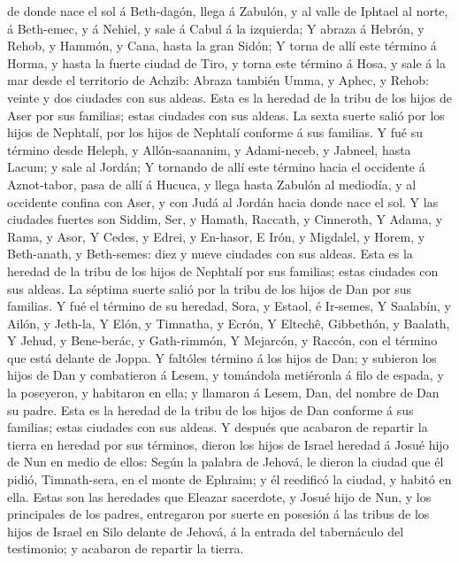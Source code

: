 de donde nace el sol á Beth-dagón, llega á Zabulón, y al valle de
Iphtael al norte, á Beth-emec, y á Nehiel, y sale á Cabul á la
izquierda;  Y abraza á Hebrón, y Rehob, y Hammón, y Cana,
hasta la gran Sidón;  Y torna de allí este término á Horma,
y hasta la fuerte ciudad de Tiro, y torna este término á Hosa, y sale á
la mar desde el territorio de Achzib:  Abraza también Umma,
y Aphec, y Rehob: veinte y dos ciudades con sus aldeas. 
Esta es la heredad de la tribu de los hijos de Aser por sus familias;
estas ciudades con sus aldeas.  La sexta suerte salió por
los hijos de Nephtalí, por los hijos de Nephtalí conforme á sus
familias.  Y fué su término desde Heleph, y Allón-saananim,
y Adami-neceb, y Jabneel, hasta Lacum; y sale al Jordán;  Y
tornando de allí este término hacia el occidente á Aznot-tabor, pasa de
allí á Hucuca, y llega hasta Zabulón al mediodía, y al occidente confina
con Aser, y con Judá al Jordán hacia donde nace el sol.  Y
las ciudades fuertes son Siddim, Ser, y Hamath, Raccath, y Cinneroth,
 Y Adama, y Rama, y Asor,  Y Cedes, y Edrei, y
En-hasor,  E Irón, y Migdalel, y Horem, y Beth-anath, y
Beth-semes: diez y nueve ciudades con sus aldeas.  Esta es
la heredad de la tribu de los hijos de Nephtalí por sus familias; estas
ciudades con sus aldeas.  La séptima suerte salió por la
tribu de los hijos de Dan por sus familias.  Y fué el
término de su heredad, Sora, y Estaol, é Ir-semes,  Y
Saalabín, y Ailón, y Jeth-la,  Y Elón, y Timnatha, y Ecrón,
 Y Eltechê, Gibbethón, y Baalath,  Y Jehud, y
Bene-berác, y Gath-rimmón,  Y Mejarcón, y Raccón, con el
término que está delante de Joppa.  Y faltóles término á
los hijos de Dan; y subieron los hijos de Dan y combatieron á Lesem, y
tomándola metiéronla á filo de espada, y la poseyeron, y habitaron en
ella; y llamaron á Lesem, Dan, del nombre de Dan su padre. 
Esta es la heredad de la tribu de los hijos de Dan conforme á sus
familias; estas ciudades con sus aldeas.  Y después que
acabaron de repartir la tierra en heredad por sus términos, dieron los
hijos de Israel heredad á Josué hijo de Nun en medio de ellos:
 Según la palabra de Jehová, le dieron la ciudad que él
pidió, Timnath-sera, en el monte de Ephraim; y él reedificó la ciudad, y
habitó en ella.  Estas son las heredades que Eleazar
sacerdote, y Josué hijo de Nun, y los principales de los padres,
entregaron por suerte en posesión á las tribus de los hijos de Israel en
Silo delante de Jehová, á la entrada del tabernáculo del testimonio; y
acabaron de repartir la tierra.

